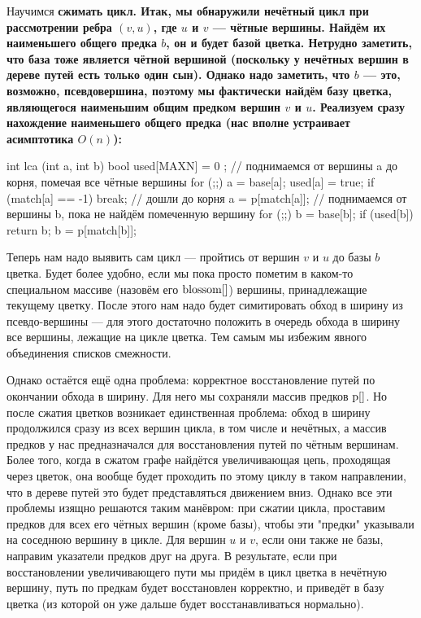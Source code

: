 Научимся \bf{сжимать цикл}. Итак, мы обнаружили нечётный цикл при рассмотрении ребра $(v,u)$, где $u$ и $v$ --- чётные вершины. Найдём их наименьшего общего предка $b$, он и будет базой цветка. Нетрудно заметить, что база тоже является чётной вершиной (поскольку у нечётных вершин в дереве путей есть только один сын). Однако надо заметить, что $b$ --- это, возможно, псевдовершина, поэтому мы фактически найдём базу цветка, являющегося наименьшим общим предком вершин $v$ и $u$. Реализуем сразу нахождение наименьшего общего предка (нас вполне устраивает асимптотика $O(n)$):

\code
int lca (int a, int b) {
	bool used[MAXN] = { 0 };
	// поднимаемся от вершины a до корня, помечая все чётные вершины
	for (;;) {
		a = base[a];
		used[a] = true;
		if (match[a] == -1)  break; // дошли до корня
		a = p[match[a]];
	}
	// поднимаемся от вершины b, пока не найдём помеченную вершину
	for (;;) {
		b = base[b];
		if (used[b])  return b;
		b = p[match[b]];
	}
}
\endcode

Теперь нам надо выявить сам цикл --- пройтись от вершин $v$ и $u$ до базы $b$ цветка. Будет более удобно, если мы пока просто пометим в каком-то специальном массиве (назовём его $\rm blossom[]$) вершины, принадлежащие текущему цветку. После этого нам надо будет симитировать обход в ширину из псевдо-вершины --- для этого достаточно положить в очередь обхода в ширину все вершины, лежащие на цикле цветка. Тем самым мы избежим явного объединения списков смежности.

Однако остаётся ещё одна проблема: корректное восстановление путей по окончании обхода в ширину. Для него мы сохраняли массив предков $\rm p[]$. Но после сжатия цветков возникает единственная проблема: обход в ширину продолжился сразу из всех вершин цикла, в том числе и нечётных, а массив предков у нас предназначался для восстановления путей по чётным вершинам. Более того, когда в сжатом графе найдётся увеличивающая цепь, проходящая через цветок, она вообще будет проходить по этому циклу в таком направлении, что в дереве путей это будет представляться движением вниз. Однако все эти проблемы изящно решаются таким манёвром: при сжатии цикла, проставим предков для всех его чётных вершин (кроме базы), чтобы эти "предки" указывали на соседнюю вершину в цикле. Для вершин $u$ и $v$, если они также не базы, направим указатели предков друг на друга. В результате, если при восстановлении увеличивающего пути мы придём в цикл цветка в нечётную вершину, путь по предкам будет восстановлен корректно, и приведёт в базу цветка (из которой он уже дальше будет восстанавливаться нормально).

